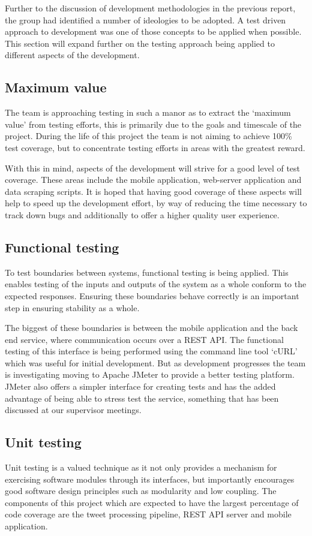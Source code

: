 ﻿Further to the discussion of development methodologies in the previous report,
the group had identified a number of ideologies to be adopted. A test driven
approach to development was one of those concepts to be applied when possible.
This section will expand further on the testing approach being applied to
different aspects of the development. 

\subsection{Maximum value}
The team is approaching testing in such a manor as to extract the `maximum
value’ from testing efforts, this is primarily due to the goals and timescale
of the project. During the life of this project the team is not aiming to
achieve 100\% test coverage, but to concentrate testing efforts in areas with
the greatest reward.

With this in mind, aspects of the development will strive for a good level of
test coverage. These areas include the mobile application, web-server
application and data scraping scripts. It is hoped that having good coverage of
these aspects will help to speed up the development effort, by way of reducing
the time necessary to track down bugs and additionally to offer a higher
quality user experience.

\subsection{Functional testing}
To test boundaries between systems, functional testing is being applied. This
enables testing of  the inputs and outputs of the system as a whole conform to
the expected responses. Ensuring these boundaries behave correctly is an
important step in ensuring stability as a whole.

The biggest of these boundaries is between the mobile application and the back
end service, where communication occurs over a REST API. The functional testing
of this interface is being performed using the command line tool ‘cURL’ which
was useful for initial development. But as development progresses the team is
investigating moving to Apache JMeter to provide a better testing platform.
JMeter also offers a simpler interface for creating tests and has the added
advantage of being able to stress test the service, something that has been
discussed at our supervisor meetings.

\subsection{Unit testing}
Unit testing is a valued technique as it not only provides a mechanism for
exercising software modules through its interfaces, but importantly encourages
good software design principles such as modularity and low coupling. The
components of this project which are expected to have the largest percentage of
code coverage are the tweet processing pipeline, REST API server and mobile
application.


